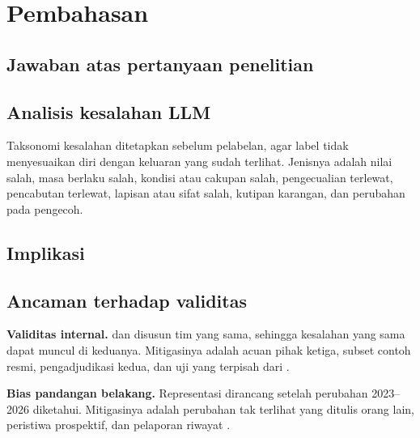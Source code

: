 \section{Pembahasan}
\label{sec:pembahasan}


\subsection{Jawaban atas pertanyaan penelitian}

\subsection{Analisis kesalahan LLM}
Taksonomi kesalahan ditetapkan sebelum pelabelan, agar label tidak menyesuaikan diri dengan keluaran yang sudah terlihat. Jenisnya adalah nilai salah, masa berlaku salah, kondisi atau cakupan salah, pengecualian terlewat, pencabutan terlewat, lapisan atau sifat salah, kutipan karangan, dan perubahan pada pengecoh. 

\subsection{Implikasi}

\subsection{Ancaman terhadap validitas}
\label{subsec:ancaman}

\textbf{Validitas internal.}  dan  disusun tim yang sama, sehingga kesalahan yang sama dapat muncul di keduanya. Mitigasinya adalah acuan pihak ketiga, subset  contoh resmi, pengadjudikasi kedua, dan uji  yang terpisah dari .

\textbf{Bias pandangan belakang.} Representasi dirancang setelah perubahan 2023--2026 diketahui. Mitigasinya adalah perubahan tak terlihat yang ditulis orang lain, peristiwa prospektif, dan pelaporan riwayat .

